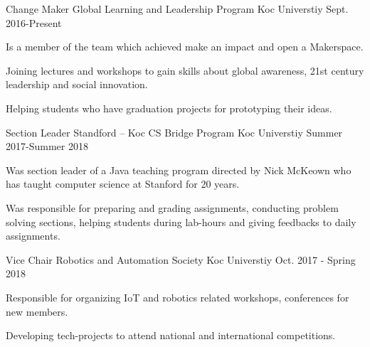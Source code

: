 

\begin{cventries}
  \cventry
    {Change Maker} %
    {Global Learning and Leadership Program} %
    {Koc Universtiy} %
    {Sept. 2016-Present} %
    {
      \begin{cvitems} %
        \item {Is a member of the team which achieved make an impact and open a Makerspace. }
        \item {Joining lectures and workshops to gain skills about global awareness, 21st century leadership and social innovation. }
        \item {Helping students who have graduation projects for prototyping their ideas. }
      \end{cvitems}
    }

  \cventry
    {Section Leader } %
    {Standford – Koc CS Bridge Program} %
    {Koc Universtiy} %
    {Summer 2017-Summer 2018} %
    {
      \begin{cvitems} %
        \item {Was section leader of a Java teaching program directed by Nick McKeown who has taught computer science at Stanford for 20 years.}
        \item {Was responsible for preparing and grading assignments, conducting problem solving sections, helping students during lab-hours and giving feedbacks to daily assignments.}
      \end{cvitems}
    }
    
  \cventry
    {Vice Chair} %
    {Robotics and Automation Society} %
    {Koc Universtiy} %
    {Oct. 2017 - Spring 2018} %
    {
      \begin{cvitems} %
        \item {Responsible for organizing IoT and robotics related workshops, conferences for new members. }
        \item {Developing tech-projects to attend national and international competitions. }
      \end{cvitems}
    }


\end{cventries}
